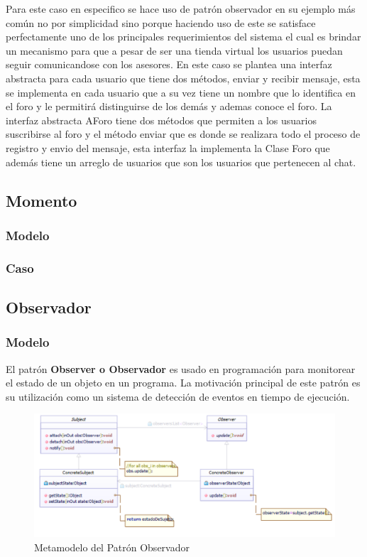 Para este caso en especifico se hace uso de patrón observador en su ejemplo más común no por simplicidad sino porque haciendo uso de este se satisface perfectamente uno de los principales requerimientos del sistema el cual es brindar un mecanismo para que a pesar de ser una tienda virtual los usuarios puedan seguir comunicandose con los asesores. \newline
En este caso se plantea una interfaz abstracta para cada usuario que tiene dos métodos, enviar y recibir mensaje, esta se implementa en cada usuario que a su vez tiene un nombre que lo identifica en el foro y le permitirá distinguirse de los demás y ademas conoce el foro. La interfaz abstracta AForo tiene dos métodos que permiten a los usuarios suscribirse al foro y el método enviar que es donde se realizara todo el proceso de registro y envio del mensaje, esta interfaz la implementa la Clase Foro que además tiene un arreglo de usuarios que son los usuarios que pertenecen al chat.

\newpage

\subsection{Momento}
\subsubsection{Modelo}
\newpage
\subsubsection{Caso}
\newpage

\subsection{Observador}
\subsubsection{Modelo}

El patrón \textbf{Observer o Observador} es usado en programación para monitorear el estado de un objeto en un programa. La motivación principal de este patrón es su utilización como un sistema de detección de eventos en tiempo de ejecución.

\begin{figure}[th!]
	\centering
	\includegraphics[width=0.8\linewidth]{arquitectura/imagenes/modeloObservador}
	\caption{Metamodelo del Patrón Observador}
	\label{fig:metamodelo patron observador}
\end{figure}

